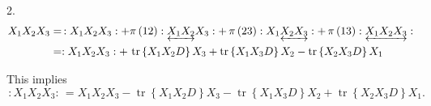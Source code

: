 \documentclass[aps,preprint]{revtex4}%
\begin{document}
2.%
\begin{align}
X_{1}X_{2}X_{3}  &  =\,:X_{1}X_{2}X_{3}:+\pi\left(  12\right)
:\underleftrightarrow{X_{1}X_{2}}X_{3}:+\,\pi\left(  23\right)  :X_{1}%
\underleftrightarrow{X_{2}X_{3}}:+\,\pi\left(  13\right)
:\underleftrightarrow{X_{1}X_{2}X_{3}}:\\
&  =:X_{1}X_{2}X_{3}:+\,\operatorname*{tr}\left\{  X_{1}X_{2}D\right\}
X_{3}+\operatorname*{tr}\left\{  X_{1}X_{3}D\right\}  X_{2}-\operatorname*{tr}%
\left\{  X_{2}X_{3}D\right\}  X_{1}%
\end{align}


This implies
\begin{equation}
\,:X_{1}X_{2}X_{3}:\,=X_{1}X_{2}X_{3}-\operatorname*{tr}\left\{  X_{1}%
X_{2}D\right\}  X_{3}-\operatorname*{tr}\left\{  X_{1}X_{3}D\right\}
X_{2}+\operatorname*{tr}\left\{  X_{2}X_{3}D\right\}  X_{1}.
\end{equation}
\end{document}
